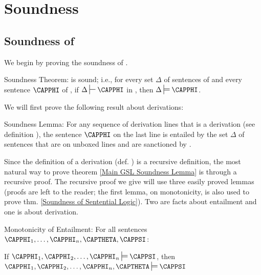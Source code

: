 \section{Soundness}

\subsection{Soundness of \GSD{}}
We begin by proving the soundness of \GSD{}.
\begin{THEOREM}{ \GSD{} Soundness Theorem:}
\GSD{} is sound; i.e., for every set $\Delta$ of sentences of \GSL{} and every sentence $\CAPPHI$ of \GSL{}, if $\Delta\sststile{}{}\CAPPHI$ in \GSD{}, then $\Delta\sdtstile{}{}\CAPPHI$.
\end{THEOREM}
\noindent{}We will first prove the following result about derivations:
\begin{THEOREM}{ Soundness Lemma:}
For any sequence of derivation lines that is a derivation (see definition ), the sentence $\CAPPHI$ on the last line is entailed by the set $\Delta$ of sentences that are on unboxed lines and are sanctioned by . 
\end{THEOREM}
\noindent{}Since the definition of a derivation (def. ) is a recursive definition, the most natural way to prove theorem \ref{Main GSL Soundness Lemma} is through a recursive proof. 
The recursive proof we give will use three easily proved lemmas (proofs are left to the reader; the first lemma, on monotonicity, is also used to prove thm. \ref{Soundness of Sentential Logic}). 
Two are facts about entailment and one is about derivation.
\begin{THEOREM}{ Monotonicity of Entailment:}
For all \GSL{} sentences $\CAPPHI_1,\ldots,\CAPPHI_{\integer{n}},\CAPTHETA,\CAPPSI$:
\begin{center}
If $\CAPPHI_1,\CAPPHI_2,\ldots,\CAPPHI_{\integer{n}}\sdtstile{}{}\CAPPSI$, then $\CAPPHI_1,\CAPPHI_2,\ldots,\CAPPHI_{\integer{n}},\CAPTHETA\sdtstile{}{}\CAPPSI$
\end{center}
\end{THEOREM}
